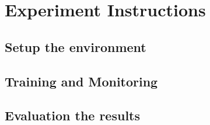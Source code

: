 \chapter{Experiment Instructions}

\section{Setup the environment}

\section{Training and Monitoring}

\section{Evaluation the results}